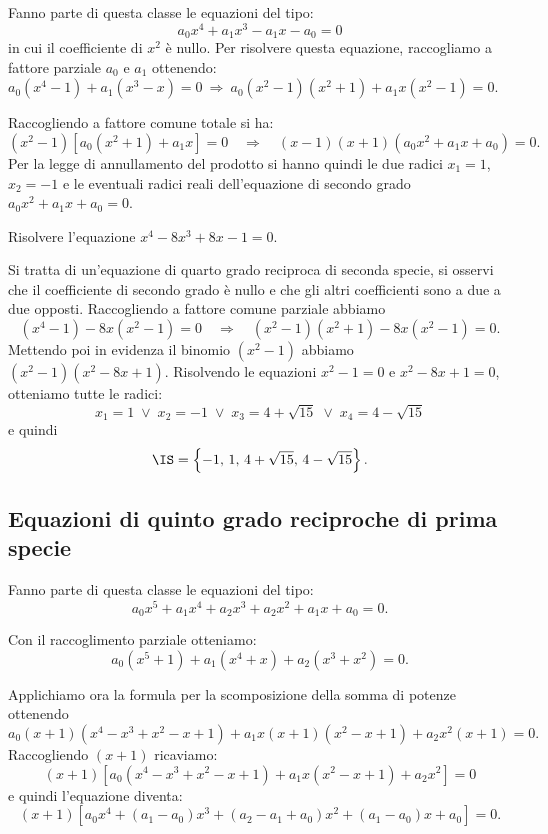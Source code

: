 Fanno parte di questa classe le equazioni del tipo: \[a_0x^4+a_1x^3-a_1x-a_0=0\] in cui il coefficiente di $x^2$ è nullo. Per risolvere questa equazione, raccogliamo a fattore parziale $a_0$ e $a_1$ ottenendo: $a_0\left(x^4-1\right)+a_1\left(x^3-x\right)=0 \:\Rightarrow\: a_0\left(x^2-1\right)\left(x^2+1\right)+a_1x\left(x^2-1\right)=0$.

Raccogliendo a fattore comune totale si ha:
\[\left(x^2-1\right)\left[a_0\left(x^2+1\right)+a_1x\right]=0\quad\Rightarrow \quad\left(x-1\right)\left(x+1\right)\left(a_0x^2+a_1x+a_0\right)=0.\]
Per la legge di annullamento del prodotto si hanno quindi le due radici $x_1=1$, $x_2=-1$ e le eventuali radici reali dell'equazione di secondo grado $a_0x^2+a_1x+a_0=0$.
\begin{exrig}
 \begin{esempio}
 Risolvere l'equazione $x^4-8x^3+8x-1=0$.

 Si tratta di un'equazione di quarto grado reciproca di seconda specie, si osservi che il coefficiente di secondo grado è nullo e che gli altri coefficienti sono a due a due opposti.
 Raccogliendo a fattore comune parziale abbiamo 
\[(x^4-1)-8x(x^2-1)=0\quad\Rightarrow\quad (x^2-1)(x^2+1)-8x(x^2-1)=0.\]
 Mettendo poi in evidenza il binomio $\left(x^2-1\right)$ abbiamo $\left(x^2-1\right)\left(x^2-8x+1\right)$. Risolvendo le equazioni $x^2-1=0$ e $x^2-8x+1=0$, otteniamo tutte le radici: 
\[x_1=1\;\vee\; x_2=-1\;\vee\; x_3=4+\sqrt{15}\;\vee\; x_4=4-\sqrt{15}\] 
e quindi 
\[\IS=\left\{-1\text{, }1\text{, }4+\sqrt{15}\text{, }4-\sqrt{15}\right\}.\]
 \end{esempio}
\end{exrig}
\ovalbox{\risolvii  \ref{ese:5.45}, \ref{ese:5.46}, \ref{ese:5.47}, \ref{ese:5.48}, \ref{ese:5.49}, \ref{ese:5.50}, \ref{ese:5.51}}

\subsection{Equazioni di quinto grado reciproche di prima specie}

Fanno parte di questa classe le equazioni del tipo: \[a_0x^5+a_1x^4+a_2x^3+a_2x^2+a_1x+a_0=0.\]

Con il raccoglimento parziale otteniamo: 
\[a_0\left(x^5+1\right)+a_1\left(x^4+x\right)+a_2\left(x^3+x^2\right)=0.\]

Applichiamo ora la formula per la scomposizione della somma di potenze ottenendo
\[a_0(x+1)\left(x^4-x^3+x^2-x+1\right)+a_1x(x+1)\left(x^2-x+1\right)+a_2x^2(x+1)=0.\]
Raccogliendo $(x+1)$ ricaviamo: 
\[(x+1)\left[a_0\left(x^4-x^3+x^2-x+1\right)+a_1x\left(x^2-x+1\right)+a_2x^2\right]=0\]
e quindi l'equazione diventa:
\[(x+1)\left[a_0x^4+(a_1-a_0)x^3+(a_2-a_1+a_0)x^2+(a_1-a_0)x+a_0\right]=0.\]

